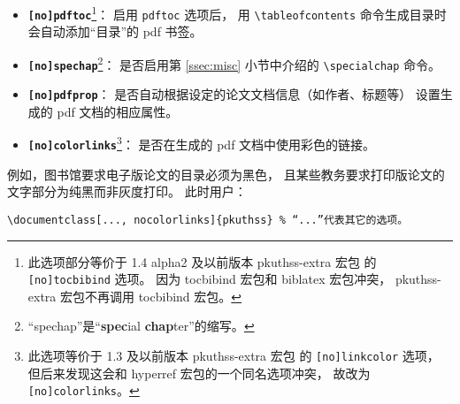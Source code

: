 \begin{itemize}
	\item \textbf{\texttt{[no]pdftoc}}\footnote{%
			此选项部分等价于 1.4 alpha2 及以前版本 pkuthss-extra 宏包
			的 \texttt{[no]tocbibind} 选项。
			因为 tocbibind 宏包和 biblatex 宏包冲突，%
			pkuthss-extra 宏包不再调用 tocbibind 宏包。%
		}：
		启用 \verb|pdftoc| 选项后，
		用 \verb|\tableofcontents| 命令生成目录时
		会自动添加“目录”的 pdf 书签。

	\item \textbf{\texttt{[no]spechap}}\footnote{%
			“spechap”是“\textbf{spec}ial \textbf{chap}ter”的缩写。%
		}：
		是否启用第 \ref{ssec:misc} 小节中介绍的
		\verb|\specialchap| 命令。

	\item \textbf{\texttt{[no]pdfprop}}：
		是否自动根据设定的论文文档信息（如作者、标题等）
		设置生成的 pdf 文档的相应属性。

	\item \textbf{\texttt{[no]colorlinks}}\footnote{%
			此选项等价于 1.3 及以前版本 pkuthss-extra 宏包
			的 \texttt{[no]linkcolor} 选项，
			但后来发现这会和 hyperref 宏包的一个同名选项冲突，
			故改为 \texttt{[no]colorlinks}。%
		}：
		是否在生成的 pdf 文档中使用彩色的链接。
\end{itemize}

例如，图书馆要求电子版论文的目录必须为黑色，
且某些教务要求打印版论文的文字部分为纯黑而非灰度打印。
此时用户：
\begin{Verbatim}[frame = single]
\documentclass[..., nocolorlinks]{pkuthss} % “...”代表其它的选项。
\end{Verbatim}

